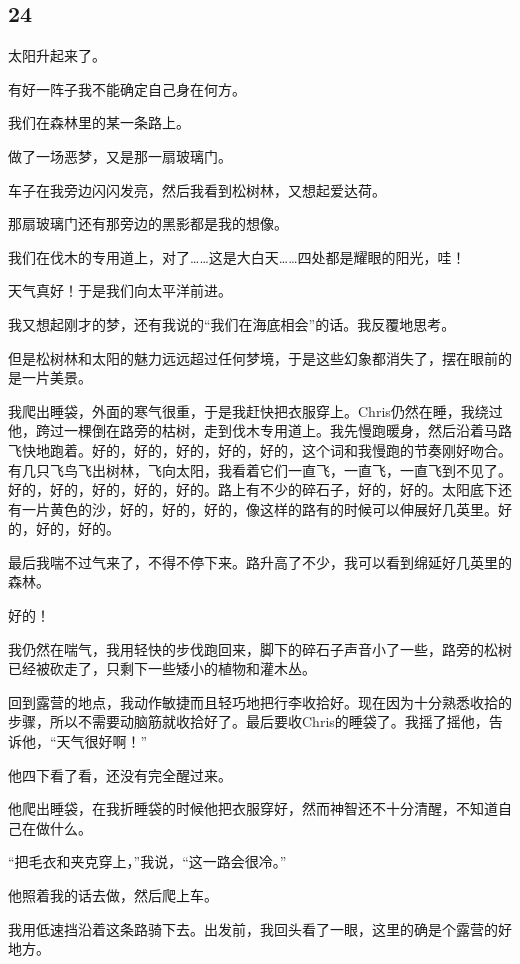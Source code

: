 \documentclass[UTF8]{article}
\begin{document}
\subsection*{24}
\par 太阳升起来了。
\par 有好一阵子我不能确定自己身在何方。
\par 我们在森林里的某一条路上。
\par 做了一场恶梦，又是那一扇玻璃门。
\par 车子在我旁边闪闪发亮，然后我看到松树林，又想起爱达荷。
\par 那扇玻璃门还有那旁边的黑影都是我的想像。
\par 我们在伐木的专用道上，对了……这是大白天……四处都是耀眼的阳光，哇！
\par 天气真好！于是我们向太平洋前进。
\par 我又想起刚才的梦，还有我说的“我们在海底相会”的话。我反覆地思考。
\par 但是松树林和太阳的魅力远远超过任何梦境，于是这些幻象都消失了，摆在眼前的是一片美景。
\par 我爬出睡袋，外面的寒气很重，于是我赶快把衣服穿上。Chris仍然在睡，我绕过他，跨过一棵倒在路旁的枯树，走到伐木专用道上。我先慢跑暖身，然后沿着马路飞快地跑着。好的，好的，好的，好的，好的，这个词和我慢跑的节奏刚好吻合。有几只飞鸟飞出树林，飞向太阳，我看着它们一直飞，一直飞，一直飞到不见了。好的，好的，好的，好的，好的。路上有不少的碎石子，好的，好的。太阳底下还有一片黄色的沙，好的，好的，好的，像这样的路有的时候可以伸展好几英里。好的，好的，好的。
\par 最后我喘不过气来了，不得不停下来。路升高了不少，我可以看到绵延好几英里的森林。
\par 好的！
\par 我仍然在喘气，我用轻快的步伐跑回来，脚下的碎石子声音小了一些，路旁的松树已经被砍走了，只剩下一些矮小的植物和灌木丛。
\par 回到露营的地点，我动作敏捷而且轻巧地把行李收拾好。现在因为十分熟悉收拾的步骤，所以不需要动脑筋就收拾好了。最后要收Chris的睡袋了。我摇了摇他，告诉他，“天气很好啊！”
\par 他四下看了看，还没有完全醒过来。
\par 他爬出睡袋，在我折睡袋的时候他把衣服穿好，然而神智还不十分清醒，不知道自己在做什么。
\par “把毛衣和夹克穿上，”我说，“这一路会很冷。”
\par 他照着我的话去做，然后爬上车。
\par 我用低速挡沿着这条路骑下去。出发前，我回头看了一眼，这里的确是个露营的好地方。
\end{document}
